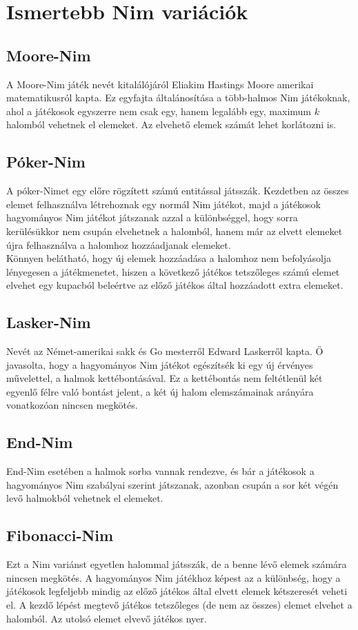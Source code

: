 \section{Ismertebb Nim variációk}
\subsection{Moore-Nim}
A Moore-Nim játék nevét kitalálójáról Eliakim Hastings Moore amerikai matematikusról kapta. Ez egyfajta általánosítása a több-halmos Nim játékoknak, ahol a játékosok egyszerre nem csak egy, hanem legalább egy, maximum $k$ halomból vehetnek el elemeket. Az elvehető elemek számát lehet korlátozni is.

\subsection{Póker-Nim}
A póker-Nimet egy előre rögzített számú entitással játsszák. Kezdetben az összes elemet felhasználva létrehoznak egy normál Nim játékot, majd a játékosok hagyományos Nim játékot játszanak azzal a különbséggel, hogy sorra kerülésükkor nem csupán elvehetnek a halomból, hanem már az elvett elemeket újra felhasználva a halomhoz hozzáadjanak elemeket. \\
Könnyen belátható, hogy új elemek hozzáadása a halomhoz nem befolyásolja lényegesen a játékmenetet, hiszen a következő játékos tetszőleges számú elemet elvehet egy kupacból beleértve az előző játékos által hozzáadott extra elemeket.

\subsection{Lasker-Nim}
Nevét az Német-amerikai sakk és Go mesterről Edward Laskerről kapta. Ő javasolta, hogy a hagyományos Nim játékot egészítsék ki egy új érvényes művelettel, a halmok kettébontásával. Ez a kettébontás nem feltétlenül két egyenlő félre való bontást jelent, a két új halom elemszámainak arányára vonatkozóan nincsen megkötés.

\subsection{End-Nim}
End-Nim esetében a halmok sorba vannak rendezve, és bár a játékosok a hagyományos Nim szabályai szerint játszanak, azonban csupán a sor két végén levő halmokból vehetnek el elemeket.

\subsection{Fibonacci-Nim}
Ezt a Nim variánst egyetlen halommal játsszák, de a benne lévő elemek számára nincsen megkötés. A hagyományos Nim játékhoz képest az a különbség, hogy a játékosok legfeljebb mindig az előző játékos által elvett elemek kétszeresét veheti el. A kezdő lépést megtevő játékos tetszőleges (de nem az összes) elemet elvehet a halomból. Az utolsó elemet elvevő játékos nyer.


